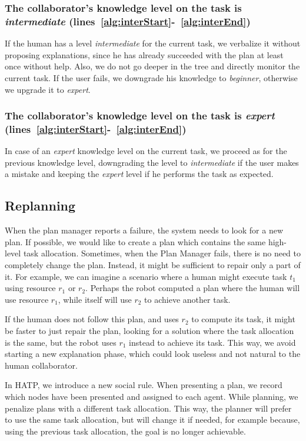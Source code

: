 \subsubsection{The collaborator's knowledge level on the task is \textit{intermediate} (lines~\ref{alg:interStart}-~\ref{alg:interEnd})}
 If the human has a level \textit{intermediate} for the current task, we verbalize it without proposing explanations, since he has already  succeeded with the plan at least once without help. Also, we do not go deeper in the tree and directly monitor the current task. If the user  fails, we downgrade his knowledge to \textit{beginner}, otherwise we upgrade it to \textit{expert}.

\subsubsection{The collaborator's knowledge level on the task is \textit{expert} (lines~\ref{alg:interStart}-~\ref{alg:interEnd})}
 In case of an \textit{expert} knowledge level on the current task, we  proceed as for the previous knowledge level, downgrading the level to \textit{intermediate} if the user makes a mistake and keeping the \textit{expert} level if he performs the task as expected.



\subsection{Replanning}
When the plan manager reports a failure, the system needs to look for a new plan. If possible, we would like to create a plan which contains the same high-level task allocation. Sometimes, when the Plan Manager fails, there is no need to completely change the plan. Instead, it might be sufficient to repair only a part of it. For example, we can imagine a scenario where a human might execute task $t_1$ using resource $r_1$ or $r_2$. Perhaps the robot computed a plan where the human will use resource $r_1$, while itself will use $r_2$ to achieve another task.

If the human does not follow this plan, and uses $r_2$ to compute its task,  it might be faster to just repair the plan, looking for a solution where the task allocation is the same, but the robot uses $r_1$ instead to achieve its task. This way, we avoid starting a new explanation phase, which could look useless and not natural to the human collaborator.


In HATP, we introduce a new social rule. When presenting a plan, we record which nodes have been presented and assigned to each agent. While planning, we penalize plans with a different task allocation. This way, the planner will prefer to use the same task allocation, but will change it if needed, for example because, using the previous task allocation, the goal is no longer achievable.



